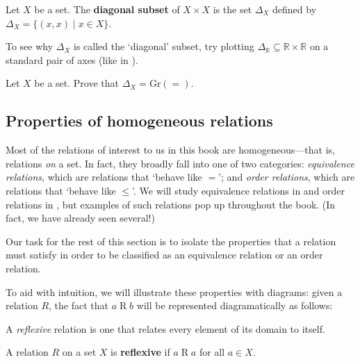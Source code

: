 \begin{definition}
\label{defDiagonalSubset}
Let $X$ be a set. The \textbf{diagonal subset} of $X \times X$ is the set $\Delta_X$  defined by $\Delta_X = \{ (x,x) \mid x \in X \}$.
\end{definition}

To see why $\Delta_X$ is called the `diagonal' subset, try plotting $\Delta_{\mathbb{R}} \subseteq \mathbb{R} \times \mathbb{R}$ on a standard pair of axes (like in ).

\begin{exercise}
Let $X$ be a set. Prove that $\Delta_X = \mathrm{Gr}(=)$.
\end{exercise}

\subsection*{Properties of homogeneous relations}

Most of the relations of interest to us in this book are homogeneous---that is, relations \textit{on} a set. In fact, they broadly fall into one of two categories: \textit{equivalence relations}, which are relations that `behave like $=$'; and \textit{order relations}, which are relations that `behave like $\le$'. We will study equivalence relations in  and order relations in , but examples of such relations pop up throughout the book. (In fact, we have already seen several!)

Our task for the rest of this section is to isolate the properties that a relation must satisfy in order to be classified as an equivalence relation or an order relation.

To aid with intuition, we will illustrate these properties with diagrams: given a relation $R$, the fact that $a \mathrel{R} b$ will be represented diagramatically as follows:
\begin{center}
\end{center}

A \textit{reflexive} relation is one that relates every element of its domain to itself.

\begin{definition}
\label{defReflexiveRelation}
A relation $R$ on a set $X$ is \textbf{reflexive} if $a \mathrel{R} a$ for all $a \in X$.
\end{definition}

